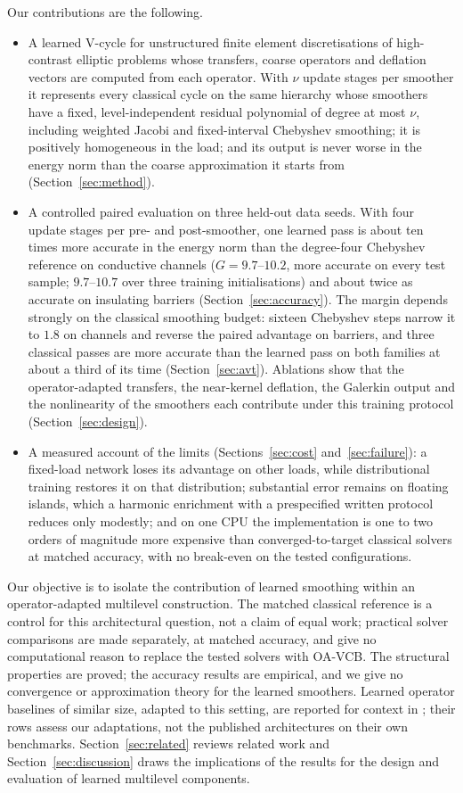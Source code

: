 Our contributions are the following.
\begin{itemize}
\item A learned V-cycle for unstructured finite element discretisations of high-contrast elliptic problems whose transfers,
coarse operators and deflation vectors are computed from each operator. With $\nu$ update stages per smoother it represents
every classical cycle on the same hierarchy whose smoothers have a fixed, level-independent residual polynomial of degree at
most $\nu$, including weighted Jacobi and fixed-interval Chebyshev smoothing; it is positively homogeneous in the load; and
its output is never worse in the energy norm than the coarse approximation it starts from (Section~\ref{sec:method}).
\item A controlled paired evaluation on three held-out data seeds. With four update stages per pre- and post-smoother, one
learned pass is about ten times more accurate in the energy norm than the degree-four Chebyshev reference on conductive
channels ($G = 9.7$--$10.2$, more accurate on every test sample; $9.7$--$10.7$ over three training initialisations) and about
twice as accurate on insulating barriers (Section~\ref{sec:accuracy}). The margin depends strongly on the classical smoothing
budget: sixteen Chebyshev steps narrow it to $1.8$ on channels and reverse the paired advantage on barriers, and three
classical passes are more accurate than the learned pass on both families at about a third of its time
(Section~\ref{sec:avt}). Ablations show that the
operator-adapted transfers, the near-kernel deflation, the Galerkin output and the nonlinearity of the smoothers each
contribute under this training protocol (Section~\ref{sec:design}).
\item A measured account of the limits (Sections~\ref{sec:cost} and~\ref{sec:failure}): a fixed-load network loses its
advantage on other loads, while distributional training restores it on that distribution; substantial error remains on
floating islands, which a harmonic enrichment with a prespecified written protocol reduces only modestly; and on one CPU the
implementation is one to two orders of magnitude more expensive than converged-to-target classical solvers at matched
accuracy, with no break-even on the tested configurations.
\end{itemize}
Our objective is to isolate the contribution of learned smoothing within an operator-adapted multilevel construction. The
matched classical reference is a control for this architectural question, not a claim of equal work; practical solver
comparisons are made separately, at matched accuracy, and give no computational reason to replace the tested solvers with
OA-VCB. The structural properties are proved; the accuracy results are empirical, and we give no convergence or
approximation theory for the learned smoothers. Learned operator baselines of similar size, adapted to this setting, are
reported for context in ; their rows assess our adaptations, not the published architectures on their
own benchmarks. Section~\ref{sec:related} reviews related work and Section~\ref{sec:discussion} draws the implications of the results
for the design and evaluation of learned multilevel components.
